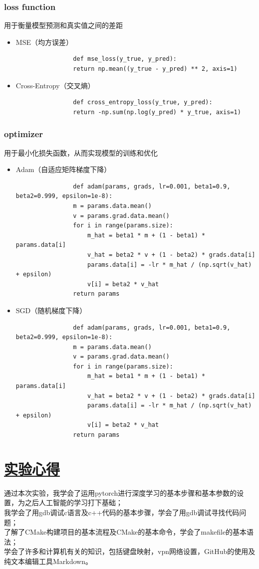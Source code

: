 \documentclass[a4paper,12pt]{article}
\begin{document}
    \subsubsection{\color{green}loss function} 
    用于衡量模型预测和真实值之间的差距
            \begin{itemize}
                \item MSE（均方误差）
            \begin{verbatim}
                def mse_loss(y_true, y_pred):
                return np.mean((y_true - y_pred) ** 2, axis=1)
            \end{verbatim}
                \item Cross-Entropy（交叉熵）
            \begin{verbatim}
                def cross_entropy_loss(y_true, y_pred):
                return -np.sum(np.log(y_pred) * y_true, axis=1)
            \end{verbatim}
            \end{itemize}

    \subsubsection{\color{green}optimizer}
    用于最小化损失函数，从而实现模型的训练和优化
            \begin{itemize}
            \item Adam（自适应矩阵梯度下降）
            \begin{verbatim}
                def adam(params, grads, lr=0.001, beta1=0.9, beta2=0.999, epsilon=1e-8):
                m = params.data.mean()
                v = params.grad.data.mean()
                for i in range(params.size):
                    m_hat = beta1 * m + (1 - beta1) * params.data[i]
                    v_hat = beta2 * v + (1 - beta2) * grads.data[i]
                    params.data[i] = -lr * m_hat / (np.sqrt(v_hat) + epsilon)
                    v[i] = beta2 * v_hat
                return params
                    \end{verbatim}
                \item SGD（随机梯度下降）
            \begin{verbatim}
                def adam(params, grads, lr=0.001, beta1=0.9, beta2=0.999, epsilon=1e-8):
                m = params.data.mean()
                v = params.grad.data.mean()
                for i in range(params.size):
                    m_hat = beta1 * m + (1 - beta1) * params.data[i]
                    v_hat = beta2 * v + (1 - beta2) * grads.data[i]
                    params.data[i] = -lr * m_hat / (np.sqrt(v_hat) + epsilon)
                    v[i] = beta2 * v_hat
                return params
            \end{verbatim}
            \end{itemize}


\newpage
\section{\underline{\color{blue}实验心得}}
通过本次实验，我学会了运用pytorch进行深度学习的基本步骤和基本参数的设置，为之后人工智能的学习打下基础；\\
我学会了用gdb调试c语言及c++代码的基本步骤，学会了用gdb调试寻找代码问题；\\
了解了CMake构建项目的基本流程及CMake的基本命令，学会了makefile的基本语法；\\
学会了许多和计算机有关的知识，包括键盘映射，vpn网络设置，GitHub的使用及纯文本编辑工具Markdown。
\end{document}
